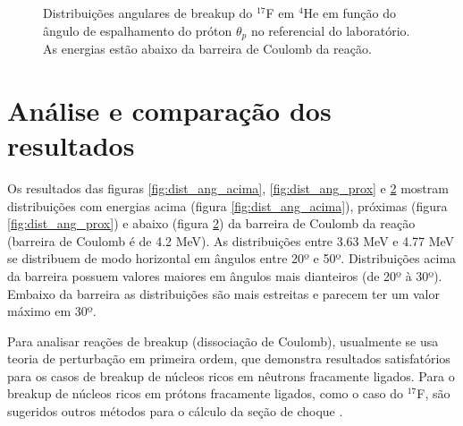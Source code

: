 \documentclass[a4paper,12pt,oneside]{book}
\begin{document}
\begin{figure}[H]
\begin{subfigure}[b]{0.48\textwidth}
        \caption{}
        \label{subfig:dist_ang_ab}
    \end{subfigure}
\caption{Distribuições angulares de breakup do $^{17}$F em $^4$He em função do ângulo de espalhamento do próton $\theta_p$ no referencial do laboratório. As energias estão abaixo da barreira de Coulomb da reação.}
\label{fig:dist_ang_abaixo}
\end{figure}
\section{Análise e comparação dos resultados}

\par Os resultados das figuras \ref{fig:dist_ang_acima}, \ref{fig:dist_ang_prox} e \ref{fig:dist_ang_abaixo} mostram distribuições com energias acima (figura \ref{fig:dist_ang_acima}), próximas (figura \ref{fig:dist_ang_prox}) e abaixo (figura \ref{fig:dist_ang_abaixo}) da barreira de Coulomb da reação (barreira de Coulomb é de 4.2 MeV). As distribuições entre 3.63 MeV e 4.77 MeV se distribuem de modo horizontal em ângulos entre 20º e 50º. Distribuições acima da barreira possuem valores maiores em ângulos mais dianteiros (de 20º à 30º). Embaixo da barreira as distribuições são mais estreitas e parecem ter um valor máximo em 30º.

\par Para analisar reações de breakup (dissociação de Coulomb), usualmente se usa teoria de perturbação em primeira ordem, que demonstra resultados satisfatórios para os casos de breakup de núcleos ricos em nêutrons fracamente ligados. Para o breakup de núcleos ricos em prótons fracamente ligados, como o caso do $^{17}$F, são sugeridos outros métodos para o cálculo da seção de choque \cite{LIANG200922, BERTULANI2003199}.
\end{document}
